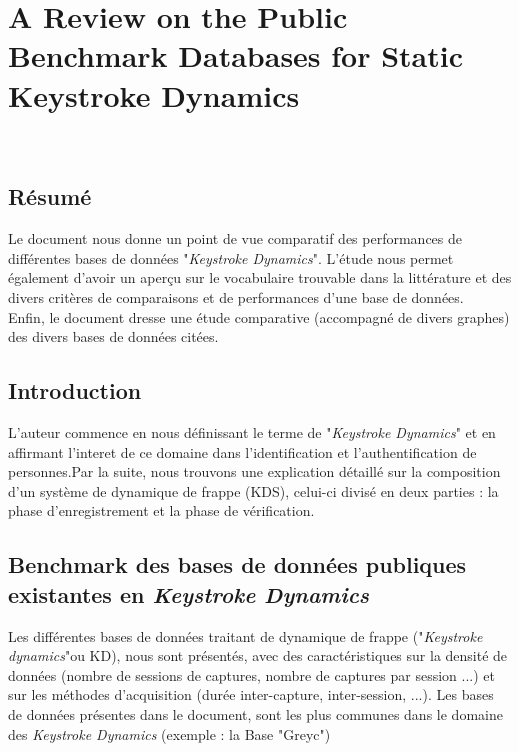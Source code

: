 \section{A Review on the Public Benchmark Databases for Static Keystroke Dynamics\cite{giotBenchmark}}

\\

\subsection{Résumé}

Le document nous donne un point de vue comparatif des performances de différentes bases de données "\textit{Keystroke Dynamics}".    
L'étude nous permet également d'avoir un aperçu sur le vocabulaire trouvable dans la littérature et des divers critères de comparaisons et de performances d'une base de données.\\

Enfin, le document dresse une étude comparative (accompagné de divers graphes) des divers bases de données citées.

\subsection{Introduction}

L'auteur commence en nous définissant le terme de "\textit{Keystroke Dynamics}" et en affirmant l'interet de ce domaine dans l'identification et l'authentification de personnes.Par la suite, nous trouvons une explication détaillé sur la composition d'un système de dynamique de frappe (KDS), celui-ci divisé en deux parties : la phase d'enregistrement et la phase de vérification.

\subsection{Benchmark des bases de données publiques existantes en \textit{Keystroke Dynamics}}

Les différentes bases de données traitant de dynamique de frappe ("\textit{Keystroke dynamics}"ou  KD), nous sont présentés, avec des caractéristiques sur la densité de données (nombre de sessions de captures, nombre de captures par session ...) et sur les méthodes d'acquisition (durée inter-capture, inter-session, ...).  Les bases de données présentes dans le document, sont les plus communes dans le domaine des \textit{Keystroke Dynamics} (exemple : la Base "Greyc")

